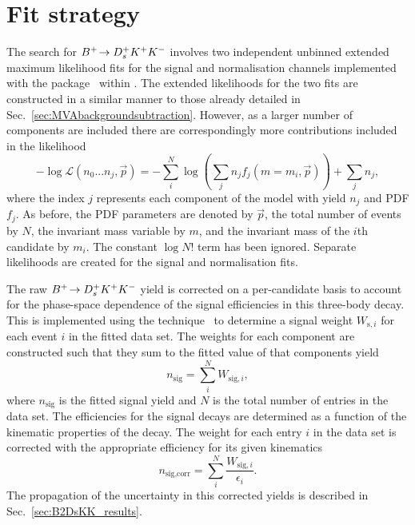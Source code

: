 \section{Fit strategy}
\label{sec:B2DsKK_fitstrategy}
The search for ${{{B}^+}}\!\rightarrow {\ensuremath{{D}^+_{s}}}{\ensuremath{{K}^+}}{\ensuremath{{K}^-}}$ involves two independent unbinned extended maximum likelihood fits for the signal and normalisation channels implemented with the \roofit package~\cite{Roofit} within \root. The extended likelihoods for the two fits are constructed in a similar manner to those already detailed in Sec.~\ref{sec:MVAbackgroundsubtraction}. However, as a larger number of components are included there are correspondingly more contributions included in the likelihood
\begin{equation}
-\log\mathcal{L}(n_{0}...n_{j},\vec{p}) = -\sum_{i}^{N} \log \left( \sum_{j} n_{j} f_{j}(m=m_{i},\vec{p}) \right) + \sum_{j}n_{j},
\end{equation}
where the index $j$ represents each component of the model with yield $n_{j}$ and PDF $f_{j}$.
As before, the PDF parameters are denoted by $\vec{p}$, the total number of events by $N$, the invariant mass variable by $m$, and the invariant mass of the $i$th candidate by $m_{i}$.
The constant $\log{N!}$ term has been ignored. Separate likelihoods are created for the signal and normalisation fits.



The raw ${{{B}^+}}\!\rightarrow {\ensuremath{{D}^+_{s}}}{\ensuremath{{K}^+}}{\ensuremath{{K}^-}}$ yield is corrected on a per-candidate basis to account for the phase-space dependence of the signal efficiencies in this three-body decay. This is implemented using the \sPlot technique~\cite{Pivk:2004ty} to determine a signal weight $W_{\text{s},i}$ for each event $i$ in the fitted data set. The weights for each component are constructed such that they sum to the fitted value of that components yield
\begin{equation}
n_{\text{sig}} = \sum_{i}^{N} W_{\text{sig},i},
\end{equation}
where $n_{\text{sig}}$ is the fitted signal yield and $N$ is the total number of entries in the data set.
The efficiencies for the \decay{\Bp}{\Dsp\Kp\Km} signal decays are determined as a function of the kinematic properties of the decay. The weight for each entry $i$ in the data set is corrected with the appropriate efficiency for its given kinematics
\begin{equation}
n_{\text{sig},\text{corr}} = \sum_{i}^{N} \frac{W_{\text{sig},i}}{\epsilon_{i}}.
\label{eq:B2DsKK_corrected_yield}
\end{equation}
The propagation of the uncertainty in this corrected yields is described in Sec.~\ref{sec:B2DsKK_results}.

